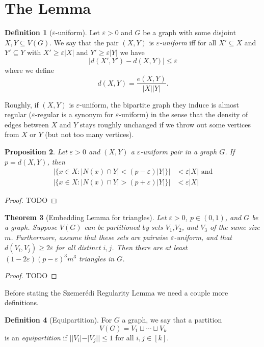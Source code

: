 \documentclass{report}
\theoremstyle{definition}
\theoremstyle{plain}
\newtheorem{thm}{Theorem}
\newtheorem{prop}[thm]{Proposition}
\theoremstyle{definition}
\newtheorem{defn}[thm]{Definition}
\begin{document}
	\section{The Lemma}
	\begin{defn}[$\varepsilon$-uniform]
		Let $\varepsilon>0$ and $G$ be a graph with some disjoint $X,Y\subseteq V(G)$. We say that the pair $(X,Y)$ is $\varepsilon$\emph{-uniform} iff for all $X'\subseteq X$ and $Y'\subseteq Y$ with $X' \geq \varepsilon |X|$ and $Y' \geq \varepsilon |Y|$ we have
		\[
			|d(X',Y') - d(X,Y)| \leq \varepsilon
		\]
		where we define
		\[
			d(X,Y) = \frac{e(X,Y)}{|X||Y|}.
		\]
	\end{defn}
	Roughly, if $(X,Y)$ is $\varepsilon$-uniform, the bipartite graph they induce is almost regular ($\varepsilon$-regular is a synonym for $\varepsilon$-uniform) in the sense that the density of edges between $X$ and $Y$ stays roughly unchanged if we throw out some vertices from $X$ or $Y$ (but not too many vertices).
	\begin{prop}
		Let $\varepsilon > 0$ and $(X,Y)$ a $\varepsilon$-uniform pair in a graph $G$. If $p = d(X,Y)$, then
		\begin{align*}
			|\{x\in X \colon |N(x) \cap Y| < (p - \varepsilon)|Y|\}| &< \varepsilon |X|\text{ and}\\
			|\{x\in X \colon |N(x) \cap Y| > (p + \varepsilon)|Y|\}| &< \varepsilon |X|
		\end{align*}
	\end{prop}
	\begin{proof}
		{\color{red}TODO}
	\end{proof}
	\begin{thm}[Embedding Lemma for triangles]
	Let $\varepsilon > 0$, $p\in (0,1)$, and $G$ be a graph. Suppose $V(G)$ can be partitioned by sets $V_1$,$V_2$, and $V_3$ of the same size $m$. Furthermore, assume that these sets are pairwise $\varepsilon$-uniform, and that $d(V_i,V_j) \geq 2\varepsilon$ for all distinct $i,j$. Then there are at least $(1-2\varepsilon)(p-\varepsilon)^3m^3$ triangles in $G$.
 	\end{thm}
 	\begin{proof}
 		{\color{red}TODO}
 	\end{proof}
 	Before stating the Szemerédi Regularity Lemma we need a couple more definitions.
 	\begin{defn}[Equipartition]
 		For $G$ a graph, we say that a partition
 		\[
 			V(G) = V_1 \sqcup \cdots \sqcup V_k
 		\]
 		is an \emph{equipartition} if $||V_i| - |V_j|| \leq 1$ for all $i,j\in [k]$.
 	\end{defn}
\end{document}
